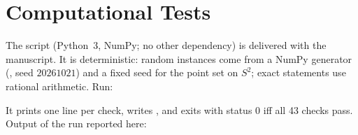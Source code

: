 \documentclass[11pt,a4paper]{article}
\theoremstyle{plain}
\theoremstyle{definition}
\begin{document}
\section{Computational Tests}\label{app:tests}
The script  (Python~3, NumPy; no other dependency) is delivered with the manuscript. It is deterministic: random instances come from a NumPy generator (, seed $20261021$) and a fixed seed for the point set on $S^2$; exact statements use rational arithmetic. Run:
\begin{center}\end{center}
It prints one line per check, writes , and exits with status $0$ iff all 43 checks pass. Output of the run reported here:
\end{document}

